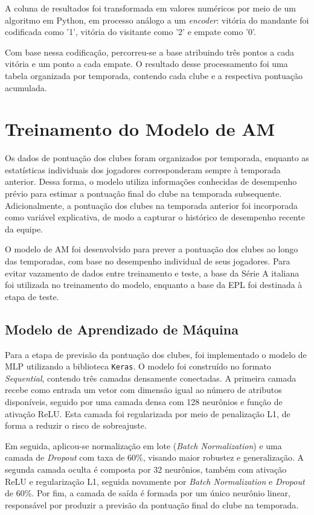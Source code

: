 A coluna de resultados foi transformada em valores numéricos por meio de um algoritmo em Python, em processo análogo a um \textit{encoder}: vitória do mandante foi codificada como '1', vitória do visitante como '2' e empate como '0'.

Com base nessa codificação, percorreu-se a base atribuindo três pontos a cada vitória e um ponto a cada empate. O resultado desse processamento foi uma tabela organizada por temporada, contendo cada clube e a respectiva pontuação acumulada.

\section{Treinamento do Modelo de AM}

Os dados de pontuação dos clubes foram organizados por temporada, enquanto as estatísticas individuais dos jogadores corresponderam sempre à temporada anterior. Dessa forma, o modelo utiliza informações conhecidas de desempenho prévio para estimar a pontuação final do clube na temporada subsequente. Adicionalmente, a pontuação dos clubes na temporada anterior foi incorporada como variável explicativa, de modo a capturar o histórico de desempenho recente da equipe.

O modelo de AM foi desenvolvido para prever a pontuação dos clubes ao longo das temporadas, com base no desempenho individual de seus jogadores. Para evitar vazamento de dados entre treinamento e teste, a base da Série A italiana foi utilizada no treinamento do modelo, enquanto a base da EPL foi destinada à etapa de teste.

\subsection{Modelo de Aprendizado de Máquina}

Para a etapa de previsão da pontuação dos clubes, foi implementado o modelo de MLP utilizando a biblioteca \texttt{Keras}. O modelo foi construído no formato \textit{Sequential}, contendo três camadas densamente conectadas. A primeira camada recebe como entrada um vetor com dimensão igual ao número de atributos disponíveis, seguido por uma camada densa com 128 neurônios e função de ativação ReLU. Esta camada foi regularizada por meio de penalização L1, de forma a reduzir o risco de sobreajuste. 

Em seguida, aplicou-se normalização em lote (\textit{Batch Normalization}) e uma camada de \textit{Dropout} com taxa de 60\%, visando maior robustez e generalização. A segunda camada oculta é composta por 32 neurônios, também com ativação ReLU e regularização L1, seguida novamente por \textit{Batch Normalization} e \textit{Dropout} de 60\%. Por fim, a camada de saída é formada por um único neurônio linear, responsável por produzir a previsão da pontuação final do clube na temporada.

